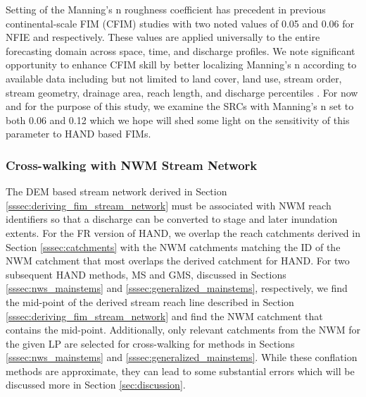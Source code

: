 \documentclass[draft]{dependencies/agujournal2019}
\begin{document}
Setting of the Manning's n roughness coefficient has precedent in previous continental-scale FIM (CFIM) studies \cite{maidment2017conceptual,liu2016cybergis,liu2020height,djokic2019arc,garousi2019terrain,zheng2018geoflood} with two noted values of 0.05 and 0.06 for NFIE and  respectively. 
These values are applied universally to the entire forecasting domain across space, time, and discharge profiles.
We note significant opportunity to enhance CFIM skill by better localizing Manning's n according to available data including but not limited to land cover, land use, stream order, stream geometry, drainage area, reach length, and discharge percentiles \cite{garousi2019terrain,johnson2019integrated}.
For now and for the purpose of this study, we examine the SRCs with Manning's n set to both 0.06 and 0.12 which we hope will shed some light on the sensitivity of this parameter to HAND based FIMs.
%
\subsubsection{Cross-walking with NWM Stream Network}
\label{sssec:cross_walking_networks}
%
The DEM based stream network derived in Section \ref{sssec:deriving_fim_stream_network} must be associated with NWM reach identifiers so that a discharge can be converted to stage and later inundation extents.
For the FR version of HAND, we overlap the reach catchments derived in Section \ref{sssec:catchments} with the NWM catchments matching the ID of the NWM catchment that most overlaps the derived catchment for HAND.
For two subsequent HAND methods, MS and GMS, discussed in Sections \ref{sssec:nws_mainstems} and \ref{sssec:generalized_mainstems}, respectively, we find the mid-point of the derived stream reach line described in Section \ref{sssec:deriving_fim_stream_network} and find the NWM catchment that contains the mid-point.
Additionally, only relevant catchments from the NWM for the given LP are selected for cross-walking for methods in Sections \ref{sssec:nws_mainstems} and \ref{sssec:generalized_mainstems}.
While these conflation methods are approximate, they can lead to some substantial errors which will be discussed more in Section \ref{sec:discussion}.
%
\end{document}
